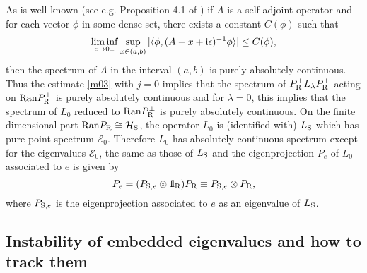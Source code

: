 \documentclass[letterpaper,onecolumn,11pt,accepted=2021-12-09]{quantumarticle}
\numberwithin{equation}{section}
\renewcommand{\r}{{\rm R}}
\newcommand{\s}{{\rm S}}
\renewcommand{\i}{{\rm i}}
\newcommand{\bbbone}{\mathchoice {\rm 1\mskip-4mu l} {\rm 1\mskip-4mu l}
	{\rm 1\mskip-4.5mu l} {\rm 1\mskip-5mu l}}
\begin{document}
As is well known (see e.g. Proposition 4.1 of \cite{Cycon}) if $A$ is a self-adjoint operator and  for each vector $\phi$ in some dense set, there exists a constant $C(\phi)$ such that  
$$
\liminf_{\epsilon\rightarrow 0_+} \sup_{x\in(a,b)}|\langle\phi, (A-x+\i\epsilon)^{-1}\phi\rangle|\le C(\phi),
$$
then the spectrum of $A$ in the interval $(a,b)$ is purely absolutely continuous. Thus the estimate \eqref{m03} with $j=0$ implies that the spectrum of $P^\perp_\r L_\lambda P^\perp_\r$ acting on ${\rm Ran}P_\r^\perp$ is purely absolutely continuous and for $\lambda=0$, this implies that the spectrum of $L_0$ reduced to ${\rm Ran}P_\r^\perp$ is purely absolutely continuous. On the finite dimensional part ${\rm Ran}P_\r\cong {\mathcal H}_\s$, the operator $L_0$ is (identified with) $L_\s$ which has pure point spectrum ${\mathcal E}_0$. Therefore $L_0$ has absolutely continuous spectrum except for the eigenvalues ${\mathcal E}_0$, the same as those of $L_\s$ and the eigenprojection $P_e$ of $L_0$ associated to $e$  is given by
\begin{equation}
P_e = ( P_{\s,e}\otimes \bbbone_\r) P_\r \equiv P_{\s,e}\otimes P_\r,
\label{m7.1}
\end{equation}
where $P_{\s,e}$ is the eigenprojection associated to $e$ as an eigenvalue of $L_\s$. 




\subsection{Instability of embedded eigenvalues and how to track them}
\label{sub:instability} 
\end{document}
